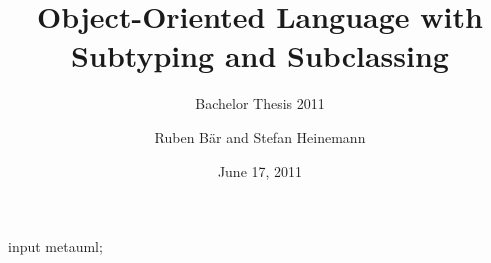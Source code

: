 \documentclass{ooplssTemplate}
\begin{document}
\begin{empfile}
\begin{empcmds}
input metauml;
\end{empcmds}


\title{Object-Oriented Language with Subtyping and Subclassing}
\subtitle{Bachelor Thesis 2011}

\author{Ruben Bär and Stefan Heinemann}

\date{June 17, 2011}




\maketitle





\thispagestyle{empty}

\tableofcontents

\newpage
{}

















\end{empfile}
\end{document}
